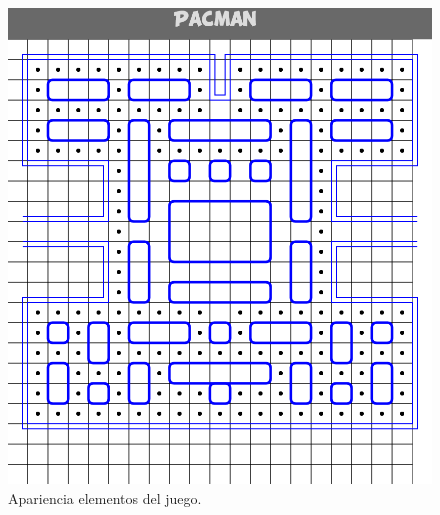 \begin{figure}[!h]
\begin{center}
   \includegraphics[width=0.4\linewidth]{Figures/ElementosGame}
	\decoRule
	\caption[Apariencia elementos del juego]{Apariencia elementos del juego.}
\label{fig:ElementosGame}
\end{center}
\end{figure}
